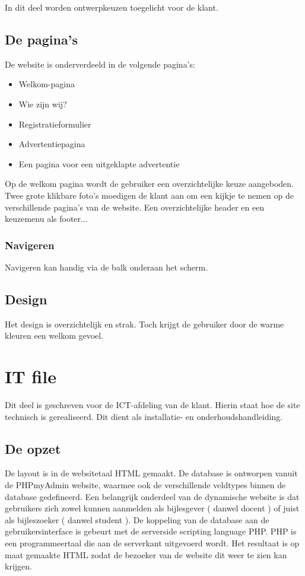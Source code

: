 \documentclass{report}
\begin{document}
            In dit deel worden ontwerpkeuzen toegelicht voor de klant.\\

        \section{De pagina's}
            De website is onderverdeeld in de volgende pagina's:
            \begin{itemize}
                \item Welkom-pagina
                \item Wie zijn wij?
                \item Registratieformulier
                \item Advertentiepagina
                \item Een pagina voor een uitgeklapte advertentie
            \end{itemize}
            
            Op de welkom pagina wordt de gebruiker een overzichtelijke keuze aangeboden. Twee grote klikbare foto's moedigen de klant aan om een kijkje te nemen op de verschillende pagina's van de website. Een overzichtelijke header en een keuzemenu als footer...
        
            \subsection{Navigeren}
                Navigeren kan handig via de balk onderaan het scherm. 
        
        \section{Design}
            Het design is overzichtelijk en strak. Toch krijgt de gebruiker door de warme kleuren een welkom gevoel.

    \chapter{IT file}
        Dit deel is geschreven voor de ICT-afdeling van de klant. Hierin staat hoe de site technisch is gerealiseerd. Dit dient als installatie- en onderhoudshandleiding.
        
        \section{De opzet}
            De layout is in de websitetaal HTML gemaakt. De database is ontworpen vanuit de PHPmyAdmin website, waarmee ook de verschillende veldtypes binnen de database gedefineerd. Een belangrijk onderdeel van de dynamische website is dat gebruikers zich zowel kunnen aanmelden als bijlesgever ( danwel docent ) of juist als bijleszoeker ( danwel student ). De koppeling van de database aan de gebruikersinterface is gebeurt met de serverside scripting language PHP. PHP is een programmeertaal die aan de serverkant uitgevoerd wordt. Het resultaat is op maat gemaakte HTML zodat de bezoeker van de website dit weer te zien kan krijgen.
\end{document}
